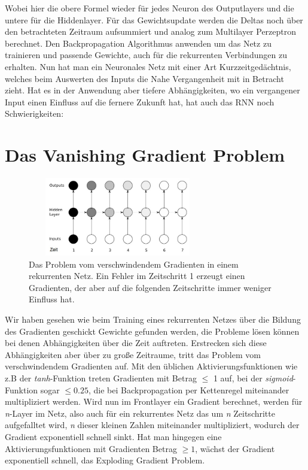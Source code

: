 Wobei hier die obere Formel wieder für jedes Neuron des Outputlayers und die untere für die Hiddenlayer. Für das Gewichtsupdate werden die Deltas noch über den betrachteten Zeitraum aufsummiert und analog zum Multilayer Perzeptron berechnet. Den Backpropagation Algorithmus anwenden um das Netz zu trainieren und passende Gewichte, auch für die rekurrenten Verbindungen zu erhalten. Nun hat man ein Neuronales Netz mit einer Art Kurzzeitgedächtnis, welches beim Auswerten des Inputs die Nahe Vergangenheit mit in Betracht zieht. Hat es in der Anwendung aber tiefere Abhängigkeiten, wo ein vergangener Input einen Einfluss auf die fernere Zukunft hat, hat auch das RNN noch Schwierigkeiten: 
\section{Das Vanishing Gradient Problem}
\begin{figure}
	\centering
	\includegraphics[width=0.7\textwidth, height=130px]{pics/vgp.jpg}	
	\caption{Das Problem vom verschwindendem Gradienten in einem rekurrenten Netz. Ein Fehler im Zeitschritt 1 erzeugt einen Gradienten, der aber auf die folgenden Zeitschritte immer weniger Einfluss hat.\cite{bib:vgp}}
	\label{img:vgp}
\end{figure}
Wir haben gesehen wie beim Training eines rekurrenten Netzes über die Bildung des Gradienten geschickt Gewichte gefunden werden, die Probleme lösen können bei denen Abhängigkeiten über die Zeit auftreten. Erstrecken sich diese Abhängigkeiten aber über zu große Zeitraume, tritt das Problem vom verschwindendem Gradienten auf. Mit den üblichen Aktivierungsfunktionen wie z.B der \textit{tanh}-Funktion treten Gradienten mit Betrag \(\leq\) 1 auf, bei der \textit{sigmoid}-Funktion sogar \(\leq 0.25\), die bei Backpropagation per Kettenregel miteinander multipliziert werden. Wird nun im Frontlayer ein Gradient berechnet, werden für \textit{n}-Layer im Netz, also auch für ein rekurrentes Netz das um \textit{n} Zeitschritte aufgefalltet wird, \textit{n} dieser kleinen Zahlen miteinander multipliziert, wodurch der Gradient exponentiell schnell sinkt. Hat man hingegen eine Aktivierungsfunktionen mit Gradienten Betrag \(\geq 1\), wächst der Gradient exponentiell schnell, das Exploding Gradient Problem.

